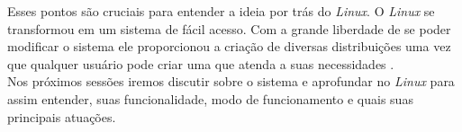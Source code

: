 Esses pontos são cruciais para entender a ideia por trás do \emph{Linux}. O \emph{Linux} se transformou em um sistema de fácil acesso. Com a grande liberdade de se poder modificar o sistema ele proporcionou a criação de diversas distribuições uma vez que qualquer usuário pode criar uma que atenda a suas necessidades \cite{LinuxFundationWIL}.\\
Nos próximos sessões  iremos discutir sobre o sistema e aprofundar no \emph{Linux} para assim entender, suas funcionalidade, modo de funcionamento e  quais suas principais atuações.\\














